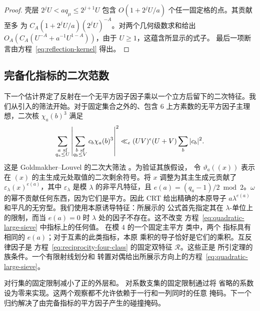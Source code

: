 \documentclass[11pt,a4paper]{article}
\numberwithin{equation}{section}
\numberwithin{figure}{section}
\theoremstyle{definition}
\theoremstyle{remark}
\begin{document}
\begin{proof}
壳层 $2^jU<a q_\mu\le2^{j+1}U$ 包含
$O(1+2^jU/a)$ 个任一固定格的点。其贡献至多
为 $C_A(1+2^jU/a)(2^jU)^{-A}$。对两个几何级数求和给出
$O_A(C_A(U^{-A}+a^{-1}U^{1-A}))$，由于 $U\ge1$，这蕴含所显示的式子。
最后一项断言由方程~\eqref{eq:reflection-kernel} 得出。
\end{proof}

\subsection{完备化指标的二次范数}下一个估计界定了反射在一个无平方因子因子乘以一个立方后留下的二次特征。我们从引入的筛法开始。对于固定集合之外的、包含 \(6\) 上方素数的无平方因子主理想，二次核 \(\chi_a(b)^3\) 满足
\begin{equation}\label{eq:quadratic-large-sieve}
 \sum_{\substack{a\ {\rm sf}\\q_a\le U}}
 \left|\sum_{\substack{b\ {\rm sf}\\q_b\le V}}
             c_b\chi_a(b)^3\right|^2
 \ll_\epsilon (UV)^\epsilon(U+V)\sum_b|c_b|^2.
\end{equation}
这是 Goldmakher--Louvel 的二次大筛法
\cite[Definition 1 and Theorem 1.1]{GL}。为验证其族假设，
令 \(\vartheta_a((x))\) 表示在 \((x)\) 的主生成元处取值的二次剩余符号。将 \(x\) 调整为其主生成元贡献了
\(\varepsilon_\lambda(x)^{e(a)}\)，其中 \(\varepsilon_\lambda\) 是模 \(\lambda\) 的非平凡特征，且
\(e(a)=(q_a-1)/2\bmod2\)。\(\omega\) 的幂不贡献任何东西，因为它们是平方。因此 CRT 给出精确的本原导子
\(a\lambda^{e(a)}\) 和平凡的无穷型。我们使用本原诱导特征：所展示的
公式首先指定其在 \(\lambda\)-单位上的限制，而当 \(e(a)=0\) 时 \(\lambda\) 处的因子不存在。这不改变
方程~\eqref{eq:quadratic-large-sieve} 中指标上的任何值。
在模 \(4\) 的一个固定主平方
类中，两个
指标具有相同的 \(e(a)\)；对于互素的此类指标，本原
乘积的导子恰好是它们的乘积。互反律因子是
方程~\eqref{eq:reciprocity-four-class} 的固定双特征 \(\mathcal R\)。这些正是
所引定理的族条件。一个有限射线划分和
转置对偶给出所展示方向上的方程~\eqref{eq:quadratic-large-sieve}。

对行集的固定限制减小了正的外层和。
对系数支集的固定限制通过将
省略的系数设为零来实现。这两个观察都不允许依赖于一行和一列同时的任意
掩码。下一个归约解决了由完备指标的平方因子产生的碰撞掩码。
\end{document}
